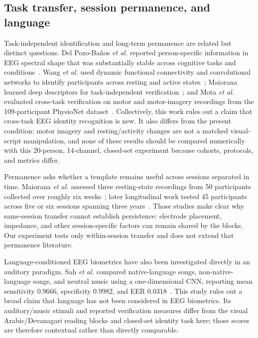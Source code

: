 \documentclass[conference]{IEEEtran}
\begin{document}
\subsection{Task transfer, session permanence, and language}
Task-independent identification and long-term permanence are related but distinct questions. Del Pozo-Ba\~nos \emph{et al.} reported person-specific information in EEG spectral shape that was substantially stable across cognitive tasks and conditions~\cite{delpozo2018}. Wang \emph{et al.} used dynamic functional connectivity and convolutional networks to identify participants across resting and active states~\cite{wang2019}; Maiorana learned deep descriptors for task-independent verification~\cite{maiorana2021}; and Mota \emph{et al.} evaluated cross-task verification on motor and motor-imagery recordings from the 109-participant PhysioNet dataset~\cite{mota2021}. Collectively, this work rules out a claim that cross-task EEG identity recognition is new. It also differs from the present condition: motor imagery and resting/activity changes are not a matched visual-script manipulation, and none of these results should be compared numerically with this 20-person, 14-channel, closed-set experiment because cohorts, protocols, and metrics differ.

Permanence asks whether a template remains useful across sessions separated in time. Maiorana \emph{et al.} assessed three resting-state recordings from 50 participants collected over roughly six weeks~\cite{maiorana2016}; later longitudinal work tested 45 participants across five or six sessions spanning three years~\cite{maiorana2018}. Those studies make clear why same-session transfer cannot establish persistence: electrode placement, impedance, and other session-specific factors can remain shared by the blocks. Our experiment tests only within-session transfer and does not extend that permanence literature.

Language-conditioned EEG biometrics have also been investigated directly in an auditory paradigm. Sah \emph{et al.} compared native-language songs, non-native-language songs, and neutral music using a one-dimensional CNN, reporting mean sensitivity 0.9666, specificity 0.9982, and EER 0.0318~\cite{sah2025}. This study rules out a broad claim that language has not been considered in EEG biometrics. Its auditory/music stimuli and reported verification measures differ from the visual Arabic/Devanagari reading blocks and closed-set identity task here; those scores are therefore contextual rather than directly comparable.
\end{document}
